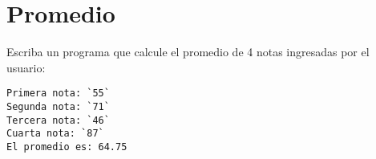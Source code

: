 \section{Promedio}

Escriba un programa que calcule el promedio de 4 notas ingresadas por el
usuario:

\begin{lstlisting}[language=testcase]
Primera nota: `55`
Segunda nota: `71`
Tercera nota: `46`
Cuarta nota: `87`
El promedio es: 64.75
\end{lstlisting}
